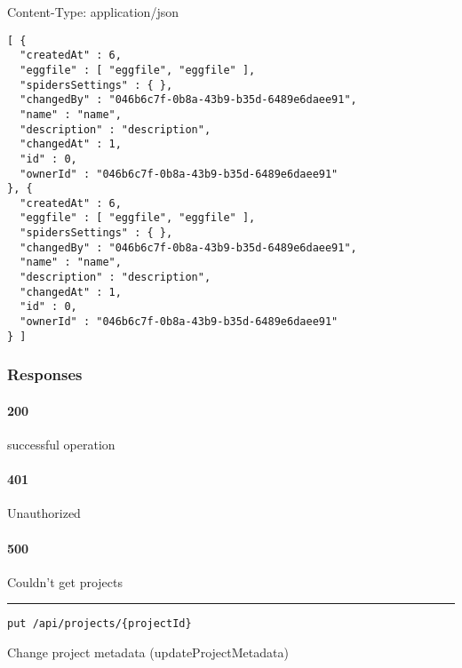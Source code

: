 Content-Type: application/json

\begin{verbatim}
[ {
  "createdAt" : 6,
  "eggfile" : [ "eggfile", "eggfile" ],
  "spidersSettings" : { },
  "changedBy" : "046b6c7f-0b8a-43b9-b35d-6489e6daee91",
  "name" : "name",
  "description" : "description",
  "changedAt" : 1,
  "id" : 0,
  "ownerId" : "046b6c7f-0b8a-43b9-b35d-6489e6daee91"
}, {
  "createdAt" : 6,
  "eggfile" : [ "eggfile", "eggfile" ],
  "spidersSettings" : { },
  "changedBy" : "046b6c7f-0b8a-43b9-b35d-6489e6daee91",
  "name" : "name",
  "description" : "description",
  "changedAt" : 1,
  "id" : 0,
  "ownerId" : "046b6c7f-0b8a-43b9-b35d-6489e6daee91"
} ]
\end{verbatim}

\hypertarget{responses-20}{%
\subsubsection*{Responses}\label{responses-20}}

\hypertarget{section-71}{%
\paragraph{200}\label{section-71}}

successful operation

\hypertarget{section-72}{%
\paragraph{401}\label{section-72}}

Unauthorized \protect\hyperlink{}{}

\hypertarget{section-73}{%
\paragraph{500}\label{section-73}}

Couldn't get projects \protect\hyperlink{}{}

\begin{center}\rule{0.5\linewidth}{0.5pt}\end{center}

\protect\hypertarget{updateProjectMetadata}{}{}



\begin{verbatim}
put /api/projects/{projectId}
\end{verbatim}

Change project metadata ({updateProjectMetadata})

